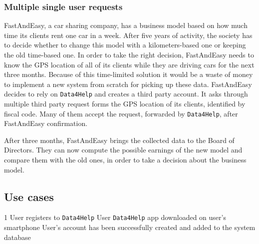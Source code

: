     \subsubsection{Multiple single user requests}

      FastAndEasy, a car sharing company, has a business model based on how much time its clients rent one car in a week. After five years of activity, the society has to decide whether to change this model with a kilometers-based one or keeping the old time-based one. In order to take the right decision, FastAndEasy needs to know the GPS location of all of its clients while they are driving cars for the next three months. Because of this time-limited solution it would be a waste of money to implement a new system from scratch for picking up these data. FastAndEasy decides to rely on \texttt{Data4Help} and creates a third party account. It asks through multiple third party request forms the GPS location of its clients, identified by fiscal code. Many of them accept the request, forwarded by \texttt{Data4Help}, after FastAndEasy confirmation.

      After three months, FastAndEasy brings the collected data to the Board of Directors. They can now compute the possible earnings of the new model and compare them with the old ones, in order to take a decision about the business model.

  \subsection{Use cases}

    \usecase %
      {1}
      {User registers to \texttt{Data4Help}}
      {User}
      {\texttt{Data4Help} app downloaded on user's smartphone}
      {}
      {User's account has been successfully created and added to the system database}
      {}
      {}

